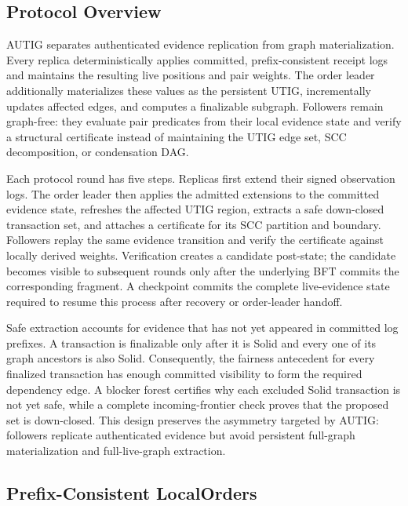 \subsection{Protocol Overview}
\label{sec:protocol-overview}

AUTIG separates authenticated evidence replication from graph materialization.
Every replica deterministically applies committed, prefix-consistent receipt
logs and maintains the resulting live positions and pair weights.  The order
leader additionally materializes these values as the persistent UTIG,
incrementally updates affected edges, and computes a finalizable subgraph.
Followers remain graph-free: they evaluate pair predicates from their local
evidence state and verify a structural certificate instead of maintaining the
UTIG edge set, SCC decomposition, or condensation DAG.

Each protocol round has five steps.  Replicas first extend their signed
observation logs.  The order leader then applies the admitted extensions to
the committed evidence state, refreshes the affected UTIG region, extracts a
safe down-closed transaction set, and attaches a certificate for its SCC
partition and boundary.  Followers replay the same evidence transition and
verify the certificate against locally derived weights.  Verification creates
a candidate post-state; the candidate becomes visible to subsequent rounds
only after the underlying BFT commits the corresponding fragment.  A
checkpoint commits the complete live-evidence state required to resume this
process after recovery or order-leader handoff.

Safe extraction accounts for evidence that has not yet appeared in committed
log prefixes.  A transaction is finalizable only after it is Solid and every
one of its graph ancestors is also Solid.  Consequently, the fairness
antecedent for every finalized transaction has enough committed visibility to
form the required dependency edge.  A blocker forest certifies why each
excluded Solid transaction is not yet safe, while a complete incoming-frontier
check proves that the proposed set is down-closed.  This design preserves the
asymmetry targeted by AUTIG: followers replicate authenticated evidence but
avoid persistent full-graph materialization and full-live-graph extraction.

\subsection{Prefix-Consistent LocalOrders}
\label{sec:prefix-consistent-localorders}

